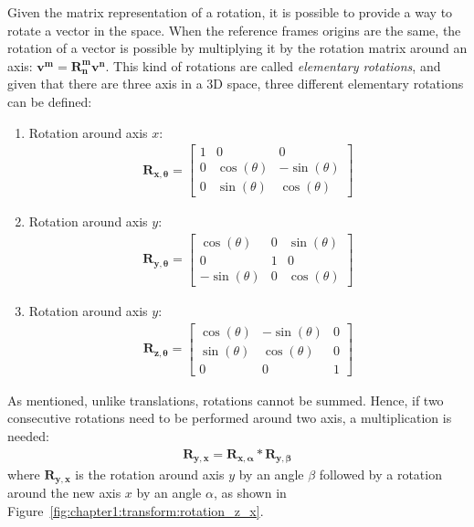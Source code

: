 Given the matrix representation of a rotation, it is possible to provide a way to rotate a vector in the space. When the reference frames origins are the same, the rotation of a vector is possible by multiplying it by the rotation matrix around an axis: $\bm{v^m} = \bm{R_n^m} \bm{v^n}$. This kind of rotations are called \emph{elementary rotations}, and given that there are three axis in a 3D space, three different elementary rotations can be defined:
\begin{enumerate}
    \item{Rotation around axis $x$: \begin{align*}
            \bm{R_{x, \theta}} = \begin{bmatrix}
                1 & 0 & 0 \\ 0 & \cos{\left(\theta\right)} & -\sin{\left(\theta\right)} \\ 0 & \sin{\left(\theta\right)} & \cos{\left(\theta\right)}
            \end{bmatrix}
    \end{align*}}
    \item{Rotation around axis $y$: \begin{align*}
        \bm{R_{y, \theta}} = \begin{bmatrix}
             \cos{\left(\theta\right)} & 0 &  \sin{\left(\theta\right)} \\ 0 & 1 & 0 \\  -\sin{\left(\theta\right)} & 0 & \cos{\left(\theta\right)}
        \end{bmatrix}
    \end{align*}}
    \item{Rotation around axis $y$: \begin{align*}
        \bm{R_{z, \theta}} = \begin{bmatrix}
            \cos{\left(\theta\right)} & -\sin{\left(\theta\right)} & 0 \\ \sin{\left(\theta\right)} & \cos{\left(\theta\right)} & 0 \\ 0 & 0 & 1
        \end{bmatrix}
    \end{align*}}
\end{enumerate}

As mentioned, unlike translations, rotations cannot be summed. Hence, if two consecutive rotations need to be performed around two axis, a multiplication is needed:
\begin{align}
    \bm{R_{y,x}} = \bm{R_{x, \alpha}} * \bm{R_{y, \beta}}
\end{align}
where $\bm{R_{y,x}}$ is the rotation around axis $y$ by an angle $\beta$ followed by a rotation around the new axis $x$ by an angle $\alpha$, as shown in Figure~\ref{fig:chapter1:transform:rotation_z_x}.

